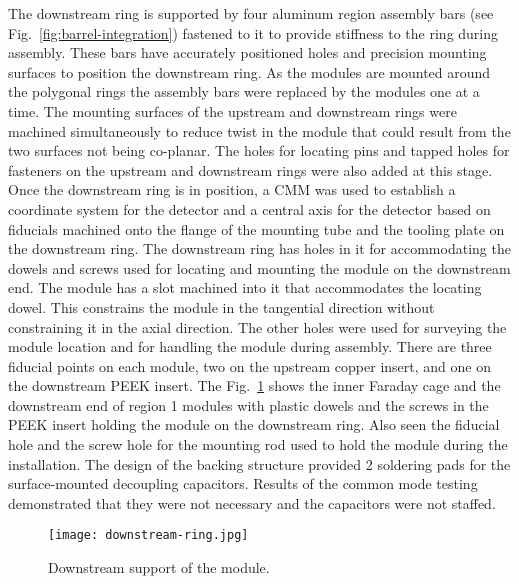 The downstream ring is supported by four aluminum region assembly bars (see Fig.~\ref{fig:barrel-integration}) fastened to it to provide stiffness to the ring during assembly. These bars have accurately positioned holes and precision mounting surfaces to position the downstream ring. As the modules are mounted around the polygonal rings the assembly bars were replaced by the modules one at a time. The mounting surfaces of the upstream and downstream rings were machined simultaneously to reduce twist in the module that could result from the two surfaces not being co-planar. The holes for locating pins and tapped holes for fasteners on the upstream and downstream rings were also added at this stage. Once the downstream ring is in position, a CMM was used to establish a coordinate system for the detector and a central axis for the detector based on fiducials machined onto the flange of the mounting tube and the tooling plate on the downstream ring. The downstream ring has holes in it for accommodating the dowels and screws used for locating and mounting the module on the downstream end. The module has a slot machined into it that accommodates the locating dowel. This constrains the module in the tangential direction without constraining it in the axial direction. 
The other holes were used for surveying the module location and for handling the module during assembly. There are three fiducial points on each module, two on the upstream copper insert, and one on the downstream PEEK insert. The Fig.~\ref{fig:downstream-ring} shows the inner Faraday cage and the downstream end of region 1 modules with plastic dowels and the screws in the PEEK insert holding the module on the downstream ring. Also seen the fiducial hole and the screw hole for the mounting rod used to hold the module during the installation. The design of the backing structure provided 2 soldering pads for the surface-mounted decoupling capacitors. Results of the common mode testing demonstrated that they were not necessary and the capacitors were not staffed.

\begin{figure}[hbt] 
\centering 
\texttt{[image: downstream-ring.jpg]}
\caption{Downstream support of the module.}
\label{fig:downstream-ring}
\end{figure}


